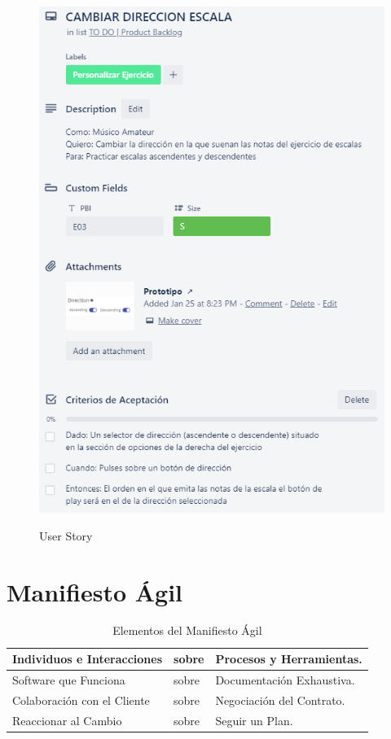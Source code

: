 \documentclass[12pt,twoside,titlepage]{report}
\begin{document}
\begin{figure}[H]
    \centering
    \includegraphics[scale=1.3]{Scrum/User Stories/EscalasDireccion}
    \label{fig:EscalasDireccion}
    \caption{User Story}
\end{figure}

\chapter{Manifiesto Ágil}

\begin{table}[h]
    \begin{center}
        \begin{tabular}{| l | l | l |}
            \hline
            Individuos e Interacciones & sobre & Procesos y Herramientas. \\ \hline
            Software que Funciona & sobre & Documentación Exhaustiva. \\ \hline
            Colaboración con el Cliente & sobre & Negociación del Contrato. \\ \hline
            Reaccionar al Cambio & sobre & Seguir un Plan. \\ \hline
        \end{tabular}
        \caption{Elementos del Manifiesto Ágil}
        \label{tab:fruta}
    \end{center}
\end{table}
\end{document}
